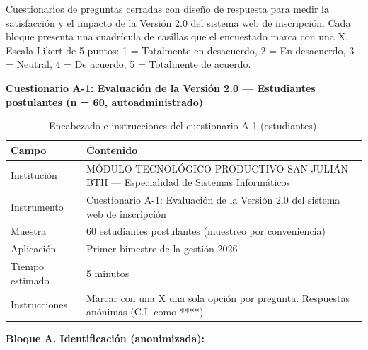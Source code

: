 
\providecommand{\casilla}{\framebox[0.38cm]{\rule{0pt}{0.33cm}}}

Cuestionarios de preguntas cerradas con diseño de respuesta para medir la satisfacción y el impacto de la Versión 2.0 del sistema web de inscripción. Cada bloque presenta una cuadrícula de casillas que el encuestado marca con una X. Escala Likert de 5 puntos: 1 = Totalmente en desacuerdo, 2 = En desacuerdo, 3 = Neutral, 4 = De acuerdo, 5 = Totalmente de acuerdo.

\Needspace{7cm}
\noindent\textbf{Cuestionario A-1: Evaluación de la Versión 2.0 --- Estudiantes postulantes (n = 60, autoadministrado)}

\begin{table}[H]
    \centering
    \caption{Encabezado e instrucciones del cuestionario A-1 (estudiantes).}
    \label{tab:a1_encabezado}
    \begin{tabularx}{\textwidth}{p{} X}
        \toprule
        \textbf{Campo} & \textbf{Contenido} \\
        \midrule
        Institución & MÓDULO TECNOLÓGICO PRODUCTIVO SAN JULIÁN BTH --- Especialidad de Sistemas Informáticos \\
        Instrumento & Cuestionario A-1: Evaluación de la Versión 2.0 del sistema web de inscripción \\
        Muestra & 60 estudiantes postulantes (muestreo por conveniencia) \\
        Aplicación & Primer bimestre de la gestión 2026 \\
        Tiempo estimado & 5 minutos \\
        Instrucciones & Marcar con una X una sola opción por pregunta. Respuestas anónimas (C.I. como ****). \\
        \bottomrule
    \end{tabularx}
\end{table}

\Needspace{12cm}
\noindent\textbf{Bloque A. Identificación (anonimizada):}

